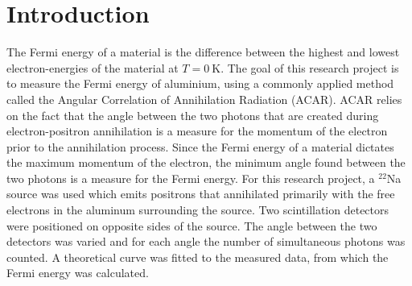 \section{Introduction}
The Fermi energy of a material is the difference between the highest and lowest electron-energies of the material at $T=0~\text{K}$. The goal of this research project is to measure the Fermi energy of aluminium, using a commonly applied method called the Angular Correlation of Annihilation Radiation (ACAR)\cite{Nascimento2009244}. ACAR relies on the fact that the angle between the two photons that are created during electron-positron annihilation is a measure for the momentum of the electron prior to the annihilation process. Since the Fermi energy of a material dictates the maximum momentum of the electron, the minimum angle found between the two photons is a measure for the Fermi energy.
For this research project, a $^{22}$Na source was used which emits positrons that annihilated primarily with the free electrons in the aluminum surrounding the source. Two scintillation detectors were positioned on opposite sides of the source. The angle between the two detectors was varied and for each angle the number of simultaneous photons was counted. A theoretical curve was fitted to the measured data, from which the Fermi energy was calculated.
